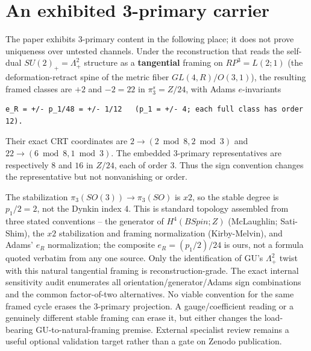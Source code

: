 \documentclass[11pt]{article}
\theoremstyle{remark}
\begin{document}
\section{An exhibited 3-primary carrier}
The paper exhibits 3-primary content in the following place; it does not prove uniqueness over untested channels. Under the reconstruction that reads the self-dual $SU(2)_+ = \Lambda^2_+$ structure as a \textbf{tangential} framing on $RP^3 = L(2;1)$ (the deformation-retract spine of the metric fiber $GL(4,R)/O(3,1)$), the resulting framed classes are $+2$ and $-2=22$ in $\pi_3^s = Z/24$, with Adams $e$-invariants

\begin{lstlisting}
e_R = +/- p_1/48 = +/- 1/12   (p_1 = +/- 4; each full class has order 12).
\end{lstlisting}
Their exact CRT coordinates are $2 \to (2 \bmod 8, 2 \bmod 3)$ and $22 \to (6 \bmod 8, 1 \bmod 3)$. The embedded 3-primary representatives are respectively $8$ and $16$ in $Z/24$, each of order 3. Thus the sign convention changes the representative but not nonvanishing or order.

The stabilization $\pi_3(SO(3)) \to \pi_3(SO)$ is $x2$, so the stable degree is $p_1/2 = 2$, not the Dynkin index 4. This is standard topology assembled from three stated conventions -- the generator of $H^4(BSpin;Z)$ (McLaughlin; Sati-Shim), the $x2$ stabilization and framing normalization (Kirby-Melvin), and Adams' $e_R$ normalization; the composite $e_R = (p_1/2)/24$ is ours, not a formula quoted verbatim from any one source. Only the identification of GU's $\Lambda^2_+$ twist with this natural tangential framing is reconstruction-grade. The exact internal sensitivity audit enumerates all orientation/generator/Adams sign combinations and the common factor-of-two alternatives. No viable convention for the same framed cycle erases the 3-primary projection. A gauge/coefficient reading or a genuinely different stable framing can erase it, but either changes the load-bearing GU-to-natural-framing premise. External specialist review remains a useful optional validation target rather than a gate on Zenodo publication.
\end{document}
